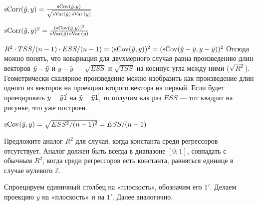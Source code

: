\begin{problem}






\begin{sol}
$\operatorname{sCorr}(\hat{y}, y)=\frac{\operatorname{sCov}(\hat{y}, y)}{\sqrt{\operatorname{sVar}(\hat{y})\operatorname{sVar}{(y)}}}$

$\operatorname{sCorr}(\hat{y}, y)^2=\frac{(\operatorname{sCov}(\hat{y}, y))^2}{\operatorname{sVar}(\hat{y})\operatorname{sVar}{(y)}} $

$R^2\cdot TSS/(n-1)\cdot ESS/(n-1)=(\operatorname{sCov}(\hat{y}, y))^2=(\operatorname{sCov}(\hat{y}-\bar y, y-\bar y))^2$
Отсюда можно понять, что ковариация для двухмерного случая равна произведению длин векторов $\hat{y}-\bar y$ и $y-\bar y$ — $\sqrt{ESS}$ и $\sqrt{TSS}$ на косинус угла между ними ($\sqrt{R^2}$). 
Геометрически скалярное произведение можно изобразить как произведение длин одного из векторов на проекцию второго вектора на первый. 
Если будет проецировать $y-\bar y\vec{1}$ на $\hat{y}-\bar y\vec{1}$, то получим как раз $ESS$ — тот квадрат на рисунке, что уже построен.


$\operatorname{sCov}(\hat{y}, y)=\sqrt{ESS^2/(n-1)^2}=ESS/(n-1)$


\end{sol}
\end{problem}


\begin{problem}
Предложите аналог $R^2$ для случая, когда константа среди регрессоров отсутствует. 
Аналог должен быть всегда в диапазоне $[0;1]$, совпадать с обычным $R^2$, когда среди регрессоров есть константа, равняться единице в случае нулевого $\hat{\varepsilon}$.


\begin{sol}
Спроецируем единичный столбец на «плоскость», обозначим его $1'$. Делаем проекцию $y$ на «плоскость» и на $1'$. Далее аналогично.
\end{sol}
\end{problem}



